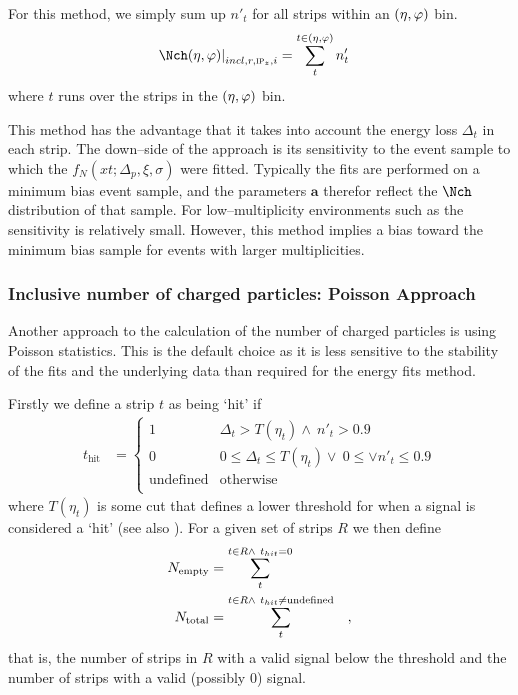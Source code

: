 For this method, we simply sum up $n'_t$ for all strips within an
$(\eta,\varphi)$ bin.
\begin{align}
  \label{eq:density1}
  \dndetadphi[incl,r,\subIPz,i] &= \sum_t^{t\in\etaphi} n'_t
\end{align}
where $t$ runs over the strips in the $(\eta,\varphi)$ bin. 

This method has the advantage that it takes into account the energy
loss $\Delta_t$ in each strip.  The down--side of the approach is its
sensitivity to the event sample to which the
$f_N(xt;\Delta_p,\xi,\sigma)$ were fitted.  Typically the fits are
performed on a minimum bias event sample, and the parameters
$\mathbf{a}$ therefor reflect the $\Nch$ distribution of that sample.
For low--multiplicity environments such as \ppCol{} the sensitivity is
relatively small.  However, this method implies a bias toward the
minimum bias sample for events with larger multiplicities.

\subsubsection{Inclusive number of charged particles: Poisson Approach} 
\label{sec:sub:sub:poisson}

\newcommand\muR{\ensuremath\mu} Another approach to the calculation of
the number of charged particles is using Poisson statistics. This is
the default choice as it is less sensitive to the stability of the
fits and the underlying data than required for the energy fits method.

Firstly we define a strip $t$ as being `hit' if 
\begin{align*}
  t_{\text{hit}} &= \left\{ 
    \begin{array}{cl}
      1 & \Delta_t > T(\eta_t) \wedge\ n'_t > 0.9\\
      0 & 0 \leq \Delta_t \leq T(\eta_t)\vee\  0 \leq \vee n'_t \leq 0.9\\
      \text{undefined} & \text{otherwise}\\ 
    \end{array}\right.
\end{align*}
where $T(\eta_t)$ is some cut that defines a lower threshold for when
a signal is considered a `hit' (see also ).  For a
given set of strips $R$ we then define 
\begin{align*}
  \Nempty{} &= \sum_t^{t\in R\wedge\ t_{hit}=0}\\
  \Ntotal{} &= \sum_t^{t\in R\wedge\ t_{hit}\neq\text{undefined}}\quad,\\
\end{align*}
that is, the number of strips in $R$ with a valid signal below the
threshold and the number of strips with a valid (possibly 0) signal. 

